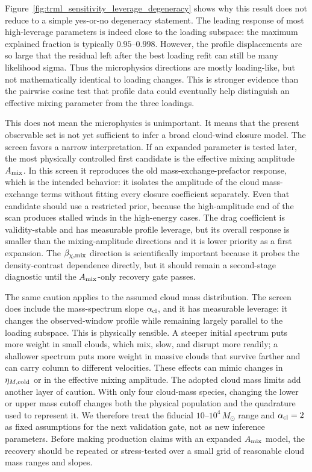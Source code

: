 Figure~\ref{fig:trml_sensitivity_leverage_degeneracy} shows why this result does
not reduce to a simple yes-or-no degeneracy statement.  The leading response of
most high-leverage parameters is indeed close to the loading subspace: the
maximum explained fraction is typically $0.95$--$0.998$.  However, the profile
displacements are so large that the residual left after the best loading refit
can still be many likelihood sigma.  Thus the microphysics directions are
mostly loading-like, but not mathematically identical to loading changes.  This
is stronger evidence than the pairwise cosine test that profile data could
eventually help distinguish an effective mixing parameter from the three
loadings.

This does not mean the microphysics is unimportant.  It means that the present
observable set is not yet sufficient to infer a broad cloud-wind closure model.
The screen favors a narrow interpretation.  If an expanded parameter is tested
later, the most physically controlled first candidate is the effective mixing
amplitude $A_{\rm mix}$.  In this screen it reproduces the old
mass-exchange-prefactor response, which is the intended behavior: it isolates
the amplitude of the cloud mass-exchange terms without fitting every closure
coefficient separately.  Even that candidate should use a restricted prior,
because the high-amplitude end of the scan produces stalled winds in the
high-energy cases.  The drag coefficient is validity-stable and has measurable
profile leverage, but its overall response is smaller than the
mixing-amplitude directions and it is lower priority as a first expansion.  The
$\beta_{\chi,\rm mix}$ direction is scientifically important because it probes
the density-contrast dependence directly, but it should remain a second-stage
diagnostic until the $A_{\rm mix}$-only recovery gate passes.

The same caution applies to the assumed cloud mass distribution.  The screen
does include the mass-spectrum slope $\alpha_{\rm cl}$, and it has measurable
leverage: it changes the observed-window profile while remaining largely
parallel to the loading subspace.  This is physically sensible.  A steeper
initial spectrum puts more weight in small clouds, which mix, slow, and
disrupt more readily; a shallower spectrum puts more weight in massive clouds
that survive farther and can carry column to different velocities.  These
effects can mimic changes in $\eta_{M,\rm cold}$ or in the effective mixing
amplitude.  The adopted cloud mass limits add another layer of caution.  With
only four cloud-mass species, changing the lower or upper mass cutoff changes
both the physical population and the quadrature used to represent it.  We
therefore treat the fiducial $10$--$10^4\,M_\odot$ range and
$\alpha_{\rm cl}=2$ as fixed assumptions for the next validation gate, not as
new inference parameters.  Before making production claims with an expanded
$A_{\rm mix}$ model, the recovery should be repeated or stress-tested over a
small grid of reasonable cloud mass ranges and slopes.

